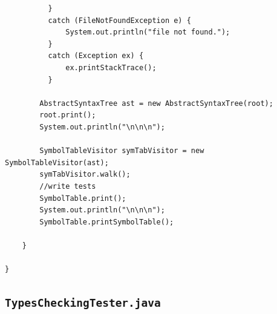 \documentclass{report}
\begin{document}
\begin{verbatim}
	      }
	      catch (FileNotFoundException e) {
	    	  System.out.println("file not found.");
	      }
	      catch (Exception ex) {
	    	  ex.printStackTrace();
	      }
	    
	    AbstractSyntaxTree ast = new AbstractSyntaxTree(root);
	    root.print();
	    System.out.println("\n\n\n");
	    
	    SymbolTableVisitor symTabVisitor = new SymbolTableVisitor(ast);
	    symTabVisitor.walk();
	    //write tests
	    SymbolTable.print();
	    System.out.println("\n\n\n");
	    SymbolTable.printSymbolTable();

	}

}

\end{verbatim}

\subsection{\texttt{TypesCheckingTester.java}}
\end{document}
